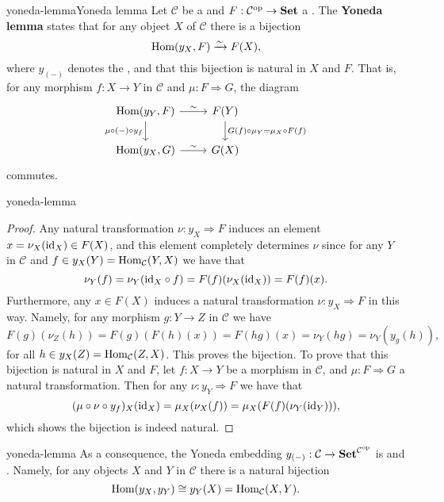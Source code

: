 \begin{topic}{yoneda-lemma}{Yoneda lemma}
    Let $\mathcal{C}$ be a  and $F : \mathcal{C}^\textup{op} \to \textbf{Set}$ a . The \textbf{Yoneda lemma} states that for any object $X$ of $\mathcal{C}$ there is a bijection
    \[ \operatorname{Hom}(y_X, F) \xrightarrow{\sim} F(X) , \]
    where $y_{(-)}$ denotes the , and that this bijection is natural in $X$ and $F$. That is, for any morphism $f : X \to Y$ in $\mathcal{C}$ and  $\mu : F \Rightarrow G$, the diagram
    \[ \begin{tikzcd} \Hom(y_Y, F) \arrow{r}{\sim} \arrow[swap]{d}{\mu \circ (-) \circ y_f} & F(Y) \arrow{d}{G(f) \circ \mu_Y = \mu_X \circ F(f)} \\ \Hom(y_X, G) \arrow{r}{\sim} & G(X) \end{tikzcd} \]
    commutes.
\end{topic}

\begin{example}{yoneda-lemma}
    \begin{proof}
        Any natural transformation $\nu : y_X \Rightarrow F$ induces an element $x = \nu_X(\textup{id}_X) \in F(X)$, and this element completely determines $\nu$ since for any $Y$ in $\mathcal{C}$ and $f \in y_X(Y) = \operatorname{Hom}_\mathcal{C}(Y, X)$ we have that
        \[ \nu_{Y}(f) = \nu_{Y}(\textup{id}_X \circ f) = F(f)(\nu_X(\textup{id}_X)) = F(f)(x) . \]
        Furthermore, any $x \in F(X)$ induces a natural transformation $\nu : y_X \Rightarrow F$ in this way. Namely, for any morphism $g : Y \to Z$ in $\mathcal{C}$ we have
        \[ F(g)(\nu_Z(h)) = F(g)(F(h)(x)) = F(hg)(x) = \nu_Y(hg) = \nu_Y(y_g(h)) , \]
        for all $h \in y_X(Z) = \operatorname{Hom}_\mathcal{C}(Z, X)$. This proves the bijection. To prove that this bijection is natural in $X$ and $F$, let $f : X \to Y$ be a morphism in $\mathcal{C}$, and $\mu : F \Rightarrow G$ a natural transformation. Then for any $\nu : y_Y \Rightarrow F$ we have that
        \[ (\mu \circ \nu \circ y_f)_X(\textup{id}_X) = \mu_X(\nu_X(f)) = \mu_X(F(f)(\nu_Y(\textup{id}_Y))) , \]
        which shows the bijection is indeed natural.
    \end{proof}
\end{example}

\begin{example}{yoneda-lemma}
    As a consequence, the Yoneda embedding $y_{(-)} : \mathcal{C} \to \textbf{Set}^{\mathcal{C}^\textup{op}}$ is  and . Namely, for any objects $X$ and $Y$ in $\mathcal{C}$ there is a natural bijection
    \[ \operatorname{Hom}(y_X, y_Y) \cong y_Y(X) = \operatorname{Hom}_\mathcal{C}(X, Y) . \]
\end{example}

